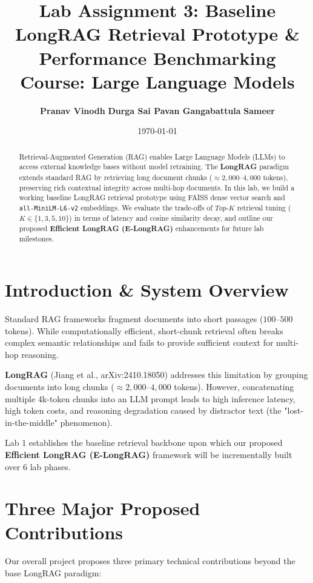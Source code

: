 \documentclass[11pt,a4paper]{article}
\title{\textbf{Lab Assignment 3: Baseline LongRAG Retrieval Prototype \& Performance Benchmarking}\\
\large\vspace{0.2cm}Course: Large Language Models}
\author{\textbf{Pranav Vinodh} \qquad \textbf{Durga Sai Pavan Gangabattula} \qquad \textbf{Sameer}}
\date{\today}
\begin{document}
\maketitle

\begin{abstract}
Retrieval-Augmented Generation (RAG) enables Large Language Models (LLMs) to access external knowledge bases without model retraining. The \textbf{LongRAG} paradigm extends standard RAG by retrieving long document chunks ($\approx 2,000$--$4,000$ tokens), preserving rich contextual integrity across multi-hop documents. In this lab, we build a working baseline LongRAG retrieval prototype using FAISS dense vector search and \texttt{all-MiniLM-L6-v2} embeddings. We evaluate the trade-offs of $Top$-$K$ retrieval tuning ($K \in \{1, 3, 5, 10\}$) in terms of latency and cosine similarity decay, and outline our proposed \textbf{Efficient LongRAG (E-LongRAG)} enhancements for future lab milestones.
\end{abstract}

\section{Introduction \& System Overview}
Standard RAG frameworks fragment documents into short passages ($100$--$500$ tokens). While computationally efficient, short-chunk retrieval often breaks complex semantic relationships and fails to provide sufficient context for multi-hop reasoning. 

\textbf{LongRAG} (Jiang et al., arXiv:2410.18050) addresses this limitation by grouping documents into long chunks ($\approx 2,000$--$4,000$ tokens). However, concatenating multiple 4k-token chunks into an LLM prompt leads to high inference latency, high token costs, and reasoning degradation caused by distractor text (the "lost-in-the-middle" phenomenon).

Lab 1 establishes the baseline retrieval backbone upon which our proposed \textbf{Efficient LongRAG (E-LongRAG)} framework will be incrementally built over 6 lab phases.

\section{Three Major Proposed Contributions}
Our overall project proposes three primary technical contributions beyond the base LongRAG paradigm:
\end{document}
